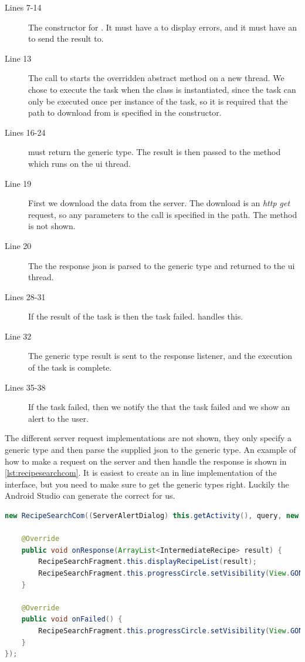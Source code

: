 \begin{description}
\item[Lines 7-14] The constructor for . It must have a  to display errors, and it must have an  to send the result to.
\item[Line 13] The call to  starts the overridden abstract method  on a new thread. We chose to execute the task when the class is instantiated, since the task can only be executed once per instance of the task, so it is required that the path to download from is specified in the constructor.
\item[Lines 16-24]  must return the generic type. The result is then passed to the method  which runs on the \ac{ui} thread.
\item[Line 19] First we download the data from the server. The download is an \textit{http get} request, so any parameters to the call is specified in the path. The  method is not shown.
\item[Line 20] The the response \ac{json} is parsed to the generic type and returned to the \ac{ui} thread.
\item[Lines 28-31] If the result of the task is  then the task failed.  handles this.
\item[Line 32] The generic type result is sent to the response listener, and the execution of the task is complete.
\item[Lines 35-38] If the task failed, then we notify the  that the task failed and we show an alert to the user.
\end{description}
The different server request implementations are not shown, they only specify a generic type and then parse the supplied \ac{json} to the generic type. An example of how to make a request on the server and then handle the response is shown in \autoref{lst:recipesearchcom}. It is easiest to create an in line implementation of the  interface, but you need to make sure to get the generic types right. Luckily the Android Studio can generate the correct  for us.

\begin{lstlisting}[language=java, label=lst:recipesearchcom, caption={Search for recipes by text}]
new RecipeSearchCom((ServerAlertDialog) this.getActivity(), query, new OnResponseListener<ArrayList<IntermediateRecipe>>() {
    
    @Override
    public void onResponse(ArrayList<IntermediateRecipe> result) {
        RecipeSearchFragment.this.displayRecipeList(result);
        RecipeSearchFragment.this.progressCircle.setVisibility(View.GONE);
    }

    @Override
    public void onFailed() {
        RecipeSearchFragment.this.progressCircle.setVisibility(View.GONE);
    }
});
\end{lstlisting}

